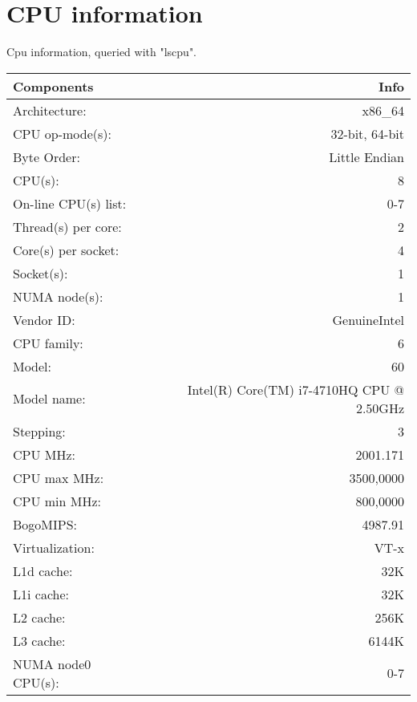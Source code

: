 \section{CPU information}
Cpu information, queried with "lscpu".
\begin{table}[H]
\begin{center}
\begin{tabular}{ l | r }
Components & Info \\
\hline

Architecture:        &   x86\_64                                   \\
CPU op-mode(s):      &   32-bit, 64-bit                            \\
Byte Order:          &   Little Endian                             \\
CPU(s):              &   8                                         \\
On-line CPU(s) list: &   0-7                                       \\
Thread(s) per core:  &   2                                         \\
Core(s) per socket:  &   4                                         \\
Socket(s):           &   1                                         \\
NUMA node(s):        &   1                                         \\
Vendor ID:           &   GenuineIntel                              \\
CPU family:          &   6                                         \\
Model:               &   60                                        \\
Model name:          &   Intel(R) Core(TM) i7-4710HQ CPU @ 2.50GHz \\
Stepping:            &   3                                         \\
CPU MHz:             &   2001.171                                  \\
CPU max MHz:         &   3500,0000                                 \\
CPU min MHz:         &   800,0000                                  \\
BogoMIPS:            &   4987.91                                   \\
Virtualization:      &   VT-x                                      \\
L1d cache:           &   32K                                       \\
L1i cache:           &   32K                                       \\
L2 cache:            &   256K                                      \\
L3 cache:            &   6144K                                     \\
NUMA node0 CPU(s):   &   0-7                                       \\

\end{tabular}
\end{center}
\end{table}


